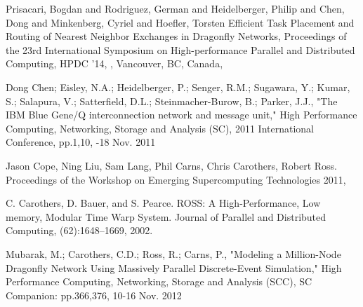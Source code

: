\documentclass[conference]{IEEEtran}
\begin{document}
\begin{thebibliography}{10}
Prisacari, Bogdan and Rodriguez, German and Heidelberger, Philip and Chen, Dong and Minkenberg, Cyriel and Hoefler, Torsten
\newblock Efficient Task Placement and Routing of Nearest Neighbor Exchanges in Dragonfly Networks,
\newblock Proceedings of the 23rd International Symposium on High-performance Parallel and Distributed Computing,
\newblock HPDC '14,
,
\newblock  Vancouver, BC, Canada,

Dong Chen; Eisley, N.A.; Heidelberger, P.; Senger, R.M.; Sugawara, Y.; Kumar,
S.; Salapura, V.; Satterfield, D.L.; Steinmacher-Burow, B.; Parker, J.J., 
\newblock "The IBM Blue Gene/Q interconnection network and message unit," 
\newblock High Performance Computing, Networking, Storage and Analysis (SC), 2011 International 
Conference,
\newblock pp.1,10, 
-18 Nov. 2011

Jason Cope, Ning Liu, Sam Lang, Phil Carns, Chris Carothers, Robert Ross.
\newblock Proceedings of the Workshop on Emerging Supercomputing Technologies 2011,



C. Carothers, D. Bauer, and S. Pearce.
\newblock ROSS: A High-Performance, Low memory, Modular Time Warp System. 
\newblock Journal of Parallel and Distributed Computing,
\newblock (62):1648–1669, 2002.

Mubarak, M.; Carothers, C.D.; Ross, R.; Carns, P.,
\newblock "Modeling a Million-Node Dragonfly Network Using Massively Parallel Discrete-Event Simulation," 
\newblock High Performance Computing, Networking, Storage and Analysis (SCC), 
 SC Companion: 
\newblock pp.366,376, 10-16 Nov. 2012




\end{thebibliography}
\end{document}

